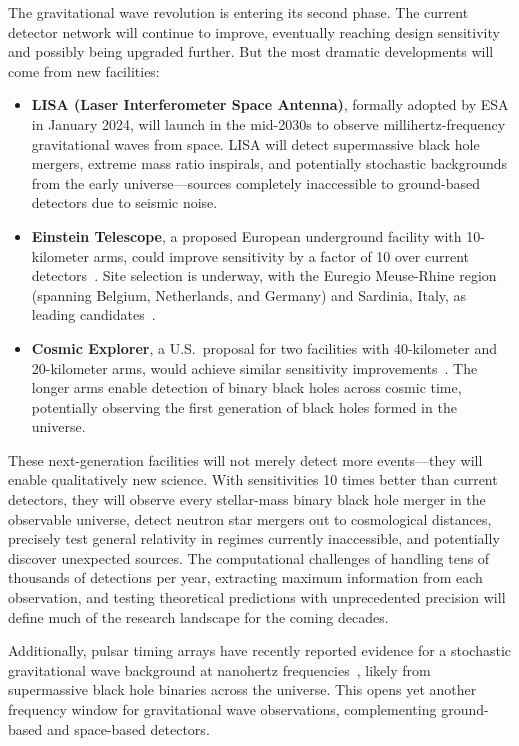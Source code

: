 The gravitational wave revolution is entering its second phase.
The current detector network will continue to improve, eventually reaching design sensitivity and possibly being upgraded further.
But the most dramatic developments will come from new facilities:
\begin{itemize}
    \item \textbf{LISA (Laser Interferometer Space Antenna)}, formally adopted by ESA in January 2024, will launch in the mid-2030s to observe millihertz-frequency gravitational waves from space.
    LISA will detect supermassive black hole mergers, extreme mass ratio inspirals, and potentially stochastic backgrounds from the early universe—sources completely inaccessible to ground-based detectors due to seismic noise.


    \item \textbf{Einstein Telescope}, a proposed European underground facility with 10-kilometer arms, could improve sensitivity by a factor of 10 over current detectors~\cite{etscienceteam_einstein_2011}.
    Site selection is underway, with the Euregio Meuse-Rhine region (spanning Belgium, Netherlands, and Germany) and Sardinia, Italy, as leading candidates~\cite{gupta_characterizing_2024}.

    \item \textbf{Cosmic Explorer}, a U.S.\ proposal for two facilities with 40-kilometer and 20-kilometer arms, would achieve similar sensitivity improvements~\cite{hall_cosmic_2022}.
    The longer arms enable detection of binary black holes across cosmic time, potentially observing the first generation of black holes formed in the universe.

\end{itemize}


These next-generation facilities will not merely detect more events—they will enable qualitatively new science.
With sensitivities 10 times better than current detectors, they will observe every stellar-mass binary black hole merger in the observable universe, detect neutron star mergers out to cosmological distances, precisely test general relativity in regimes currently inaccessible, and potentially discover unexpected sources.
The computational challenges of handling tens of thousands of detections per year, extracting maximum information from each observation, and testing theoretical predictions with unprecedented precision will define much of the research landscape for the coming decades.


Additionally, pulsar timing arrays have recently reported evidence for a stochastic gravitational wave background at nanohertz frequencies~\cite{agazie_nanograv_2023,eptacollaborationandinptacollaboration:_second_2023,thefermi-latcollaboration*+_gammaray_2022}, likely from supermassive black hole binaries across the universe.
This opens yet another frequency window for gravitational wave observations, complementing ground-based and space-based detectors.


